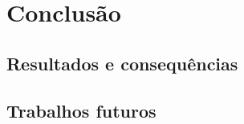 \chapter{Conclusão} \label{cap:conclusao}
\section{Resultados e consequências}
\section{Trabalhos futuros}
